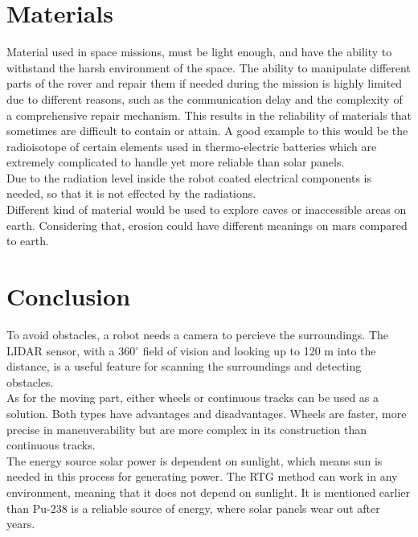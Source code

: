 \section{Materials}
Material used in space missions, must be light enough, and have the ability to withstand the harsh environment of the space.
The ability to manipulate different parts of the rover and repair them if needed during the mission is highly limited due to different reasons, such as the communication delay and the complexity of a comprehensive repair mechanism. This results in the reliability of materials that sometimes are difficult to contain or attain. A good example to this would be the radioisotope of certain elements used in thermo-electric batteries which are extremely complicated to handle yet more reliable than solar panels\cite{NuclearPower}. \\ Due to the radiation level inside the robot coated electrical components is needed, so that it is not effected by the radiations.\\
 Different kind of material would be used to explore caves or inaccessible areas on earth. Considering that, erosion could have different meanings on mars compared to earth.


\section{Conclusion}
To avoid obstacles, a robot needs a camera to percieve the surroundings. The LIDAR sensor, with a 360$^{\circ}$ field of vision and looking up to 120 m into the distance, is a useful feature for scanning the surroundings and detecting obstacles.\\
As for the moving part, either wheels or continuous tracks can be used as a solution. Both types have advantages and disadvantages. Wheels are faster, more precise in maneuverability but are more complex in its construction than continuous tracks.\\
The energy source solar power is dependent on sunlight, which means sun is needed in this process for generating power. The RTG method can work in any environment, meaning that it does not depend on sunlight. It is mentioned earlier than Pu-238 is a reliable source of energy, where solar panels wear out after years.

